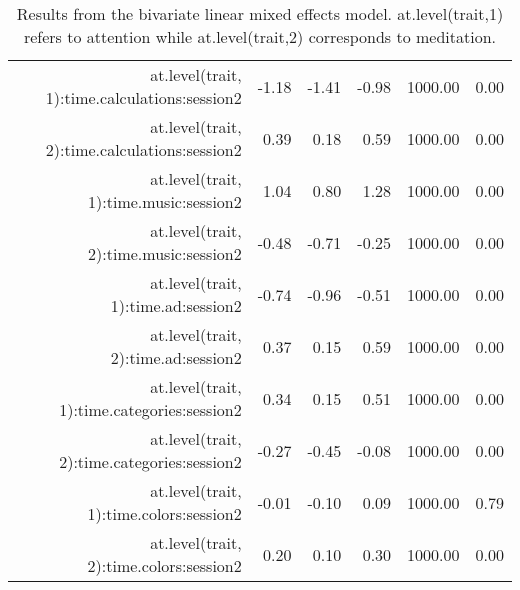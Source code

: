 \begin{table}[ht]
\begin{tabular}{rrrrrr}
  at.level(trait, 1):time.calculations:session2 & -1.18 & -1.41 & -0.98 & 1000.00 & 0.00 \\ 
  at.level(trait, 2):time.calculations:session2 & 0.39 & 0.18 & 0.59 & 1000.00 & 0.00 \\ 
  at.level(trait, 1):time.music:session2 & 1.04 & 0.80 & 1.28 & 1000.00 & 0.00 \\ 
  at.level(trait, 2):time.music:session2 & -0.48 & -0.71 & -0.25 & 1000.00 & 0.00 \\ 
  at.level(trait, 1):time.ad:session2 & -0.74 & -0.96 & -0.51 & 1000.00 & 0.00 \\ 
  at.level(trait, 2):time.ad:session2 & 0.37 & 0.15 & 0.59 & 1000.00 & 0.00 \\ 
  at.level(trait, 1):time.categories:session2 & 0.34 & 0.15 & 0.51 & 1000.00 & 0.00 \\ 
  at.level(trait, 2):time.categories:session2 & -0.27 & -0.45 & -0.08 & 1000.00 & 0.00 \\ 
  at.level(trait, 1):time.colors:session2 & -0.01 & -0.10 & 0.09 & 1000.00 & 0.79 \\ 
  at.level(trait, 2):time.colors:session2 & 0.20 & 0.10 & 0.30 & 1000.00 & 0.00 \\ 
   \hline
\end{tabular}
\caption{Results from the bivariate
               linear mixed effects model. at.level(trait,1) refers to attention while 
               at.level(trait,2) corresponds to meditation.} 
\label{tab:bivariate}
\end{table}
